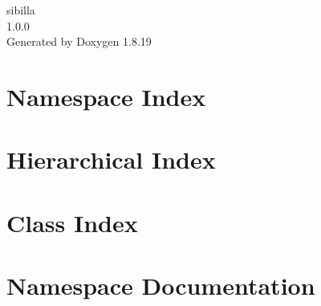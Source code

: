\let\mypdfximage\pdfximage\def\pdfximage{\immediate\mypdfximage}\documentclass[twoside]{book}
\newcommand{\+}{\discretionary{\mbox{\scriptsize$\hookleftarrow$}}{}{}}
\newcommand{\clearemptydoublepage}{%
  \newpage{\pagestyle{empty}\cleardoublepage}%
}
\begin{document}
\hypersetup{pageanchor=false,
             bookmarksnumbered=true,
             pdfencoding=unicode
            }
\begin{titlepage}
\vspace*{7cm}
\begin{center}%
{\Large sibilla \\[1ex]\large 1.\+0.\+0 }\\
\vspace*{1cm}
{\large Generated by Doxygen 1.8.19}\\
\end{center}
\end{titlepage}
\clearemptydoublepage
{}
\tableofcontents
\clearemptydoublepage
{}
\hypersetup{pageanchor=true}

\chapter{Namespace Index}

\chapter{Hierarchical Index}

\chapter{Class Index}

\chapter{Namespace Documentation}











\end{document}
